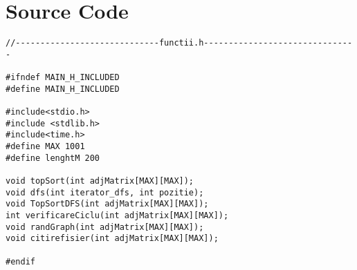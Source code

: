 \documentclass[14pt]{article}
\begin{document}
\section*{Source Code}
\begin{lstlisting}
//-----------------------------functii.h-------------------------------

#ifndef MAIN_H_INCLUDED
#define MAIN_H_INCLUDED

#include<stdio.h>
#include <stdlib.h>
#include<time.h>
#define MAX 1001
#define lenghtM 200

void topSort(int adjMatrix[MAX][MAX]);
void dfs(int iterator_dfs, int pozitie);
void TopSortDFS(int adjMatrix[MAX][MAX]);
int verificareCiclu(int adjMatrix[MAX][MAX]);
void randGraph(int adjMatrix[MAX][MAX]);
void citirefisier(int adjMatrix[MAX][MAX]);

#endif



\end{lstlisting}
\end{document}
